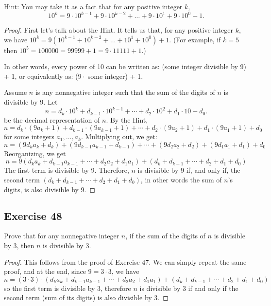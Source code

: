 \documentclass[14pt]{extarticle}
\begin{document}
Hint: You may take it as a fact that for any positive
integer $k$,
\[
    10^k = 9\cdot10^{k-1} + 9\cdot10^{k-2} + \ldots + 9\cdot10^1 + 9\cdot10^0 + 1.
\]
\begin{proof}
    First let's talk about the Hint. It tells us that, for any positive integer $k$, we have $10^k = 9(10^{k-1} +10^{k-2} + \ldots + 10^1 + 10^0) + 1$. (For example, if $k = 5$ then $10^5 = 100000 = 99999 + 1 = 9 \cdot 11111 + 1$.)

    In other words, every power of 10 can be written as: (some integer divisible by 9) + 1, or equivalently as: ($9 \cdot$ some integer) + 1.

    Assume $n$ is any nonnegative integer such that the sum of the digits of $n$ is divisible by 9. Let
    \[
        n = d_k \cdot 10^k + d_{k-1} \cdot 10^{k-1} + \cdots + d_2 \cdot 10^2 + d_1 \cdot 10 + d_0.
    \]
    be the decimal representation of $n$. By the Hint,
    \[
        n = d_k \cdot (9a_k + 1) + d_{k-1} \cdot (9a_{k-1}+1) + \cdots + d_2 \cdot (9a_2+1) + d_1 \cdot (9a_1+1) + d_0
    \]
    for some integers $a_1, \ldots, a_k$. Multiplying out, we get:
    \[
        n = (9d_ka_k + d_k) + (9d_{k-1}a_{k-1} + d_{k-1}) + \cdots + (9d_2 a_2 + d_2) + (9d_1a_1 + d_1) + d_0
    \]
    Reorganizing, we get
    \[
        n = 9(d_ka_k + d_{k-1}a_{k-1} + \cdots + d_2 a_2 + d_1a_1) + (d_k + d_{k-1} + \cdots + d_2 + d_1 + d_0)
    \]
    The first term is divisible by 9. Therefore, $n$ is divisible by 9 if, and only if, the second term $(d_k + d_{k-1} + \cdots + d_2 + d_1 + d_0)$, in other words the sum of $n$'s digits, is also divisible by 9.
\end{proof}

\subsection{Exercise 48}
Prove that for any nonnegative integer $n$, if the sum of the digits of $n$ is divisible by 3, then $n$ is divisible by 3.

\begin{proof}
    This follows from the proof of Exercise 47. We can simply repeat the same proof, and at the end, since $9 = 3 \cdot 3$, we have
    \[
        n = (3 \cdot 3) \cdot(d_ka_k + d_{k-1}a_{k-1} + \cdots + d_2 a_2 + d_1a_1) + (d_k + d_{k-1} + \cdots + d_2 + d_1 + d_0)
    \]
    so the first term is divisible by 3, therefore $n$ is divisible by 3 if and only if the second term (sum of its digits) is also divisible by 3.
\end{proof}
\end{document}
